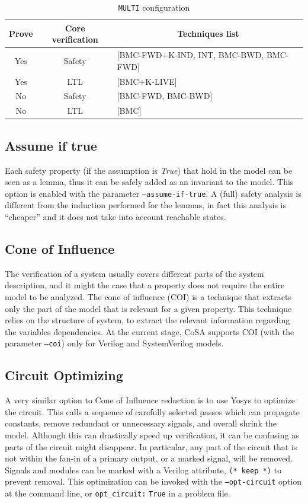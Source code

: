 \documentclass{article}
\theoremstyle{definition}
\begin{document}
\begin{table}[h]
  \centering
\begin{tabular}{ c c | l }
  Prove & Core verification & \multicolumn{1}{|c}{Techniques list} \\ \hline
  Yes & Safety & [BMC-FWD+K-IND, INT, BMC-BWD, BMC-FWD]  \\
  Yes & LTL & [BMC+K-LIVE]  \\
  No & Safety & [BMC-FWD, BMC-BWD]  \\
  No & LTL & [BMC]  \\
\end{tabular}
\caption{\texttt{MULTI} configuration}
\label{tab:multi_conf}
\end{table}


\subsection{Assume if true}
Each safety property (if the assumption is \emph{True}) that hold in
the model can be seen as a lemma, thus it can be safely added as an
invariant to the model. This option is enabled with the parameter
\texttt{--assume-if-true}. A (full) safety analysis is different from
the induction performed for the lemmas, in fact this analysis is
``cheaper'' and it does not take into account reachable states.

\subsection{Cone of Influence}
The verification of a system usually covers different parts of the
system description, and it might the case that a property does not
require the entire model to be analyzed. The cone of influence (COI)
is a technique that extracts only the part of the model that is
relevant for a given property. This technique relies on the structure
of system, to extract the relevant information regarding the variables
dependencies. At the current stage, CoSA supports COI (with the
parameter \texttt{--coi}) only for Verilog and SystemVerilog models.

\subsection{Circuit Optimizing}
A very similar option to Cone of Influence reduction is to use Yosys
to optimize the circuit. This calls a sequence of carefully selected
passes which can propagate constants, remove redundant or unnecessary
signals, and overall shrink the model. Although this can drastically
speed up verification, it can be confusing as parts of the circuit
might disappear. In particular, any part of the circuit that is not
within the fan-in of a primary output, or a marked signal, will be
removed. Signals and modules can be marked with a Verilog attribute,
\texttt{(* keep *)} to prevent removal. This optimization can be invoked
with the \texttt{--opt-circuit} option at the command line, or
\texttt{opt\_circuit:} \texttt{True} in a problem file.
\end{document}
